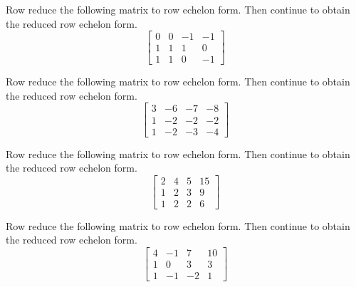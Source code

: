 \documentclass{ximera}
\begin{document}
\begin{problem}\label{prb:2.19} Row reduce the following matrix to row echelon form. Then continue to obtain the reduced row echelon form.
\begin{equation*}
\left[
\begin{array}{rrrr}
0 & 0 & -1 & -1 \\
1 & 1 & 1 & 0 \\
1 & 1 & 0 & -1
\end{array}
\right]
\end{equation*}
\end{problem}

\begin{problem}\label{prb:2.20} Row reduce the following matrix to row echelon form. Then continue to obtain the reduced row echelon form.
\begin{equation*}
\left[
\begin{array}{rrrr}
3 & -6 & -7 & -8 \\
1 & -2 & -2 & -2 \\
1 & -2 & -3 & -4
\end{array}
\right]
\end{equation*}
\end{problem}

\begin{problem}\label{prb:2.21} Row reduce the following matrix to row echelon form. Then continue to obtain the reduced row echelon form.
\begin{equation*}
\left[
\begin{array}{rrrr}
2 & 4 & 5 & 15 \\
1 & 2 & 3 & 9 \\
1 & 2 & 2 & 6
\end{array}
\right]
\end{equation*}
\end{problem}

\begin{problem}\label{prb:2.22} Row reduce the following matrix to row echelon form. Then continue to obtain the reduced row echelon form.
\begin{equation*}
\left[
\begin{array}{rrrr}
4 & -1 & 7 & 10 \\
1 & 0 & 3 & 3 \\
1 & -1 & -2 & 1
\end{array}
\right]
\end{equation*}
\end{problem}
\end{document}
